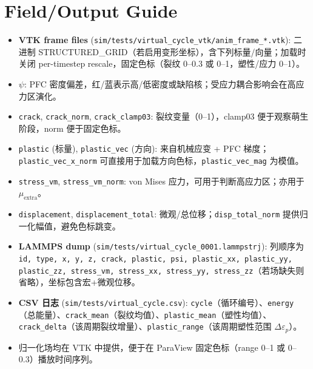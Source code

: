 \documentclass[11pt]{article}
\begin{document}
\section{Field/Output Guide}
\begin{itemize}
    \item \textbf{VTK frame files} (\texttt{sim/tests/virtual\_cycle\_vtk/anim\_frame\_*.vtk}): 二进制 STRUCTURED\_GRID（若启用变形坐标），含下列标量/向量；加载时关闭 per-timestep rescale，固定色标（裂纹 0--0.3 或 0--1，塑性/应力 0--1）。
    \item $\psi$: PFC 密度偏差，红/蓝表示高/低密度或缺陷核；受应力耦合影响会在高应力区演化。
    \item \texttt{crack}, \texttt{crack\_norm}, \texttt{crack\_clamp03}: 裂纹变量（0--1），clamp03 便于观察萌生阶段，norm 便于固定色标。
    \item \texttt{plastic} (标量), \texttt{plastic\_vec} (方向): 来自机械应变 + PFC 梯度；\texttt{plastic\_vec\_x\_norm} 可直接用于加载方向色标，\texttt{plastic\_vec\_mag} 为模值。
    \item \texttt{stress\_vm}, \texttt{stress\_vm\_norm}: von Mises 应力，可用于判断高应力区；亦用于 $\mu_\text{extra}$。
    \item \texttt{displacement}, \texttt{displacement\_total}: 微观/总位移；\texttt{disp\_total\_norm} 提供归一化幅值，避免色标跳变。
    \item \textbf{LAMMPS dump} (\texttt{sim/tests/virtual\_cycle\_0001.lammpstrj}): 列顺序为 \texttt{id, type, x, y, z, crack, plastic, psi, plastic\_xx, plastic\_yy, plastic\_zz, stress\_vm, stress\_xx, stress\_yy, stress\_zz}（若场缺失则省略），坐标包含宏+微观位移。
    \item \textbf{CSV 日志} (\texttt{sim/tests/virtual\_cycle.csv}): \texttt{cycle}（循环编号）、\texttt{energy}（总能量）、\texttt{crack\_mean}（裂纹均值）、\texttt{plastic\_mean}（塑性均值）、\texttt{crack\_delta}（该周期裂纹增量）、\texttt{plastic\_range}（该周期塑性范围 $\Delta\varepsilon_p$）。
    \item 归一化场均在 VTK 中提供，便于在 ParaView 固定色标（range 0--1 或 0--0.3）播放时间序列。
\end{itemize}
\end{document}
